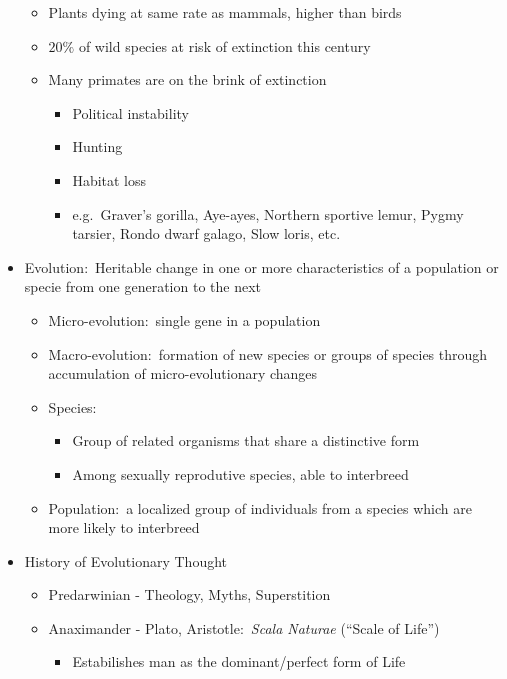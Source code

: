 \documentclass[12pt]{article}
\begin{document}
\begin{itemize}
\begin{itemize}
            \item Plants dying at same rate as mammals, higher than birds
            \item $20\%$ of wild species at risk of extinction this century
            \item Many primates are on the brink of extinction
            \begin{itemize}
                \item Political instability
                \item Hunting
                \item Habitat loss
                \item e.g.\ Graver's gorilla, Aye-ayes, Northern sportive lemur, Pygmy tarsier, Rondo dwarf galago, Slow loris, etc.
            \end{itemize}
        \end{itemize}
        \item Evolution:\ Heritable change in one or more characteristics of a population or specie from one generation to the next
        \begin{itemize}
            \item Micro-evolution:\ single gene in a population
            \item Macro-evolution:\ formation of new species or groups of species through accumulation of micro-evolutionary changes
            \item Species:
            \begin{itemize}
                \item Group of related organisms that share a distinctive form
                \item Among sexually reprodutive species, able to interbreed
            \end{itemize}
            \item Population:\ a localized group of individuals from a species which are more likely to interbreed
        \end{itemize}
        \item History of Evolutionary Thought
        \begin{itemize}
            \item Predarwinian - Theology, Myths, Superstition
            \item Anaximander - Plato, Aristotle:\ \textit{Scala Naturae} (``Scale of Life'')
            \begin{itemize}
                \item Estabilishes man as the dominant/perfect form of Life

\end{itemize}
\end{itemize}
\end{itemize}
\end{document}
